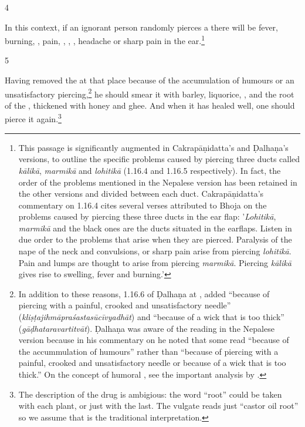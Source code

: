 \begin{translation}
\item [4] 
 
In this context, if an ignorant person randomly pierces a 
there will be fever, burning, , pain, ,
, ,
headache or sharp pain in the ear.\footnote{This passage is significantly
    augmented in Cakrapāṇidatta's and Ḍalhaṇa's versions, to outline the specific
    problems caused by piercing three ducts called \emph{kālikā}, \emph{marmikā} and
    \emph{lohitikā} (1.16.4 \citep[126]{acar-1939} and 1.16.5 \citep[77]{vulgate}
    respectively). In fact, the order of the problems mentioned in the Nepalese
    version has been retained in the other versions and divided between each duct.
    Cakrapāṇidatta's commentary on 1.16.4 \citep[126]{acar-1939} cites several verses
    attributed to Bhoja on the problems caused by piercing these three ducts in the
    ear flap: '\emph{Lohitikā}, \emph{marmikā} and the black ones are the ducts
    situated in the earflaps.  Listen in due order to the problems that arise when
    they are pierced. Paralysis of the nape of the neck and convulsions, or sharp pain
    arise from piercing \emph{lohitikā}. Pain and lumps are thought to arise from
    piercing \emph{marmikā}. Piercing \emph{kālikā} gives rise to swelling, fever and
    burning.'}
    
\item[5]     
    
Having removed the  at that place because of the accumulation of
humours or an unsatisfactory piercing,\footnote{In addition to these reasons,
    1.16.6 of Ḍalhaṇa at , added “because of piercing with a painful,
    crooked and unsatisfactory needle” (\emph{kliṣṭajihmāpraśastasūcīvyadhāt}) and 
    “because of a wick that is too thick” (\emph{gāḍhataravartitvāt}). Ḍalhaṇa was
    aware of the reading in the Nepalese version because in his commentary on
     he noted that some read “because of the accummulation of humours”
    rather than “because of piercing with a painful, crooked and unsatisfactory needle
    or because of a wick that is too thick.” On the concept of humoral
    , see the important analysis by \citet{meul-1992}.} he
    should smear it with barley, liquorice, ,
    and the root of the , thickened with honey and
    ghee. And when it has healed well, one should pierce it again.\footnote{The
        description of the drug is ambigious: the word “root” could be taken with each
        plant, or just with the last.  The vulgate reads just “castor oil root” so we
        assume that is the traditional interpretation.}
    

\end{translation}

